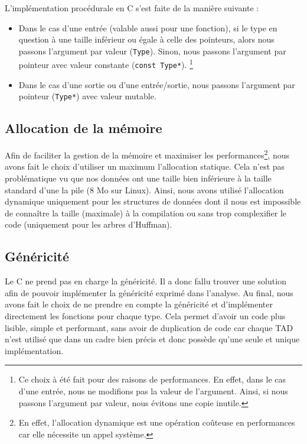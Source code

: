 L'implémentation procédurale en C s'est faite de la manière suivante :

\begin{itemize}
    \item Dans le cas d'une entrée (valable aussi pour une fonction), si le type en question à une taille inférieur ou égale à celle des pointeurs, alors nous passons l'argument par valeur (\texttt{Type}).
    Sinon, nous passons l'argument par pointeur avec valeur constante (\texttt{const Type*}).
    \footnote{Ce choix à été fait pour des raisons de performances. En effet, dans le cas d'une entrée, nous ne modifions pas la valeur de l'argument. Ainsi, si nous passons l'argument par valeur, nous évitons une copie inutile.}
    \item Dans le cas d'une sortie ou d'une entrée/sortie, nous passons l'argument par pointeur (\texttt{Type*}) avec valeur mutable.
\end{itemize}

\subsection{Allocation de la mémoire}

Afin de faciliter la gestion de la mémoire et maximiser les performances\footnote{En effet, l'allocation dynamique est une opération coûteuse en performances car elle nécessite un appel système.},
nous avons fait le choix d'utiliser un maximum l'allocation statique.
Cela n'est pas problématique vu que nos données ont une taille bien inférieure à la taille standard d'une la pile (8 Mo sur Linux).
Ainsi, nous avons utilisé l'allocation dynamique uniquement pour les structures de données dont il nous est impossible de connaître la taille (maximale) à la compilation ou sans trop complexifier le code
(uniquement pour les arbres d'Huffman).

\subsection{Généricité}

Le C ne prend pas en charge la généricité. Il a donc fallu trouver une solution afin de pouvoir implémenter la généricité exprimé dans l'analyse.
Au final, nous avons fait le choix de ne prendre en compte la généricité et d'implémenter directement les fonctions pour chaque type.
Cela permet d'avoir un code plus lisible, simple et performant, sans avoir de duplication de code car chaque TAD n'est utilisé que dans un cadre bien précis et donc possède qu'une seule et unique implémentation.
